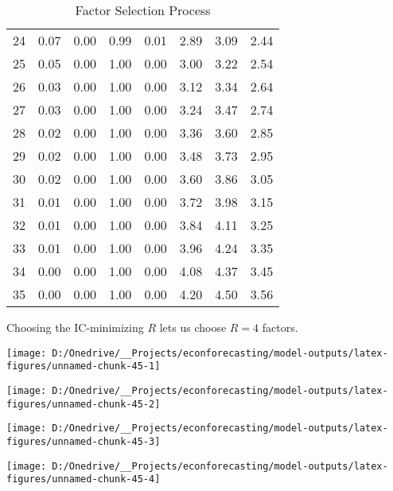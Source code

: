 \documentclass[11pt, letterpaper]{article}\usepackage[]{graphicx}\usepackage[]{color}
\begin{document}
\begin{table}[H]
\begin{tabular}{cccccccc}
   24 & 0.07 & 0.00 & 0.99 & 0.01 & 2.89 & 3.09 & 2.44 \\ 
   25 & 0.05 & 0.00 & 1.00 & 0.00 & 3.00 & 3.22 & 2.54 \\ 
   26 & 0.03 & 0.00 & 1.00 & 0.00 & 3.12 & 3.34 & 2.64 \\ 
   27 & 0.03 & 0.00 & 1.00 & 0.00 & 3.24 & 3.47 & 2.74 \\ 
   28 & 0.02 & 0.00 & 1.00 & 0.00 & 3.36 & 3.60 & 2.85 \\ 
   29 & 0.02 & 0.00 & 1.00 & 0.00 & 3.48 & 3.73 & 2.95 \\ 
   30 & 0.02 & 0.00 & 1.00 & 0.00 & 3.60 & 3.86 & 3.05 \\ 
   31 & 0.01 & 0.00 & 1.00 & 0.00 & 3.72 & 3.98 & 3.15 \\ 
   32 & 0.01 & 0.00 & 1.00 & 0.00 & 3.84 & 4.11 & 3.25 \\ 
   33 & 0.01 & 0.00 & 1.00 & 0.00 & 3.96 & 4.24 & 3.35 \\ 
   34 & 0.00 & 0.00 & 1.00 & 0.00 & 4.08 & 4.37 & 3.45 \\ 
   35 & 0.00 & 0.00 & 1.00 & 0.00 & 4.20 & 4.50 & 3.56 \\ 
   \hline
\end{tabular}
\endgroup
\caption{Factor Selection Process} 
\end{table}


Choosing the IC-minimizing $R$ lets us choose $R = 4$ factors.



{\centering \texttt{[image: D:/Onedrive/\_\_Projects/econforecasting/model-outputs/latex-figures/unnamed-chunk-45-1]} 

}




{\centering \texttt{[image: D:/Onedrive/\_\_Projects/econforecasting/model-outputs/latex-figures/unnamed-chunk-45-2]} 

}




{\centering \texttt{[image: D:/Onedrive/\_\_Projects/econforecasting/model-outputs/latex-figures/unnamed-chunk-45-3]} 

}




{\centering \texttt{[image: D:/Onedrive/\_\_Projects/econforecasting/model-outputs/latex-figures/unnamed-chunk-45-4]} 

}
\end{document}

